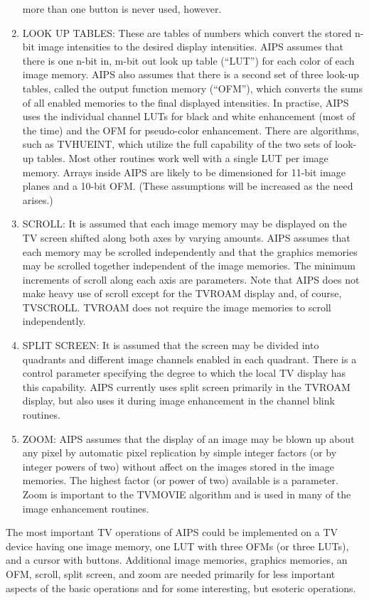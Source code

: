 \begin{enumerate}
more than one button is never used, however.
\item LOOK UP TABLES:  These are tables of numbers which convert the
stored n-bit image intensities to the desired display intensities.
AIPS assumes that there is one n-bit in, m-bit out look up table
(``LUT'') for each color of each image memory.  AIPS also assumes that
there is a second set of three look-up tables, called the output
function memory (``OFM''), which converts the sums of all enabled
memories to the final displayed intensities.  In practise, AIPS uses
the individual channel LUTs for black and white enhancement (most of
the time) and the OFM for pseudo-color enhancement.  There are
algorithms, such as TVHUEINT, which utilize the full capability of the
two sets of look-up tables.  Most other routines work well with a
single LUT per image memory. Arrays inside AIPS are likely to be
dimensioned for 11-bit image planes and a 10-bit OFM.  (These
assumptions will be increased as the need arises.)
\item SCROLL:  It is assumed that each image memory may be displayed
on the TV screen shifted along both axes by varying amounts. AIPS
assumes that each memory may be scrolled independently and that the
graphics memories may be scrolled together independent of the image
memories.  The minimum increments of scroll along each axis are
parameters.  Note that AIPS does not make heavy use of scroll except
for the TVROAM display and, of course, TVSCROLL.  TVROAM does not
require the image memories to scroll independently.
\item SPLIT SCREEN:  It is assumed that the screen may be divided
into quadrants and different image channels enabled in each quadrant.
There is a control parameter specifying the degree to which the local
TV display has this capability.  AIPS currently uses split screen
primarily in the TVROAM display, but also uses it during image
enhancement in the channel blink routines.
\item ZOOM:  AIPS assumes that the display of an image may be blown
up about any pixel by automatic pixel replication by simple integer
factors (or by integer powers of two) without affect on the images
stored in the image memories.  The highest factor (or power of two)
available is a parameter. Zoom is important to the TVMOVIE algorithm
and is used in many of the image enhancement routines.
\end{enumerate} %

The most important TV operations of AIPS could be implemented on a TV
device having one image memory, one LUT with three OFMs (or three
LUTs), and a cursor with buttons.  Additional image memories, graphics
memories, an OFM, scroll, split screen, and zoom are needed primarily
for less important aspects of the basic operations and for some
interesting, but esoteric operations.

